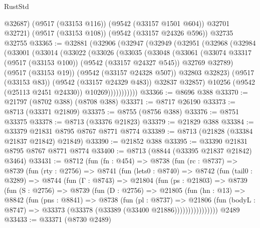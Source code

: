 \begin{lexlean}{RustStd}
\begin{coremodule}
        @32687)
      (@9517 (@33153 @116))
      (@9542 (@33157 @1501 @604))
      @32701
      @32721)
    (@9517 (@33153 @108))
    (@9542 (@33157 @24326 @596))
    @32735
    @32755
@33365 := @32881
    (@32906
      (@32947
        (@32949
          (@32951
            (@32968
              (@32984
                (@33001
                  (@33014
                    (@33022
                      (@33026
                        (@33035
                          (@33048
                            (@33061
                              (@33074
                                @33317
                                (@9517 (@33153 @100))
                                (@9542 (@33157 @24327 @545))
                                @32769
                                @32789)
                              (@9517 (@33153 @19))
                              (@9542 (@33157 @24328 @507))
                              @32803
                              @32823)
                            (@9517 (@33153 @83))
                            (@9542 (@33157 @24329 @483))
                            @32837
                            @32857)
                          @10256
                          (@9542 (@25113 @2451 @24330))
                          @10269)))))))))))
@33366 := @8696 @388
@33370 := @21797 (@8702 @388) (@8708 @388)
@33371 := @8717 @26190
@33373 := @8713 (@33371 @21809)
@33375 := @8755 (@8756 @388)
@33376 := @8751 @33375
@33378 := @8713 (@33376 @21823)
@33379 := @21829 @388
@33384 := @33379 @21831 @8795 @8767 @8771 @8774
@33389 := @8713 (@21828 (@33384 @21837 @21842) @21849)
@33390 := @21852 @388
@33395 := @33390 @21831 @8795 @8767 @8771 @8774
@33400 := @8713 (@8844 (@33395 @21837 @21842) @3464)
@33431 := @8712
    (fun (fn : @454) =>
    @8738
      (fun (rc : @8737) =>
      @8739
        (fun (rty : @2756) =>
        @8741
          (fun (lets0 : @8740) =>
          @8742
            (fun (tail0 : @3289) =>
            @8744
              (fun (Γ : @8743) =>
              @21804
                (fun (ps : @21803) =>
                @8739
                  (fun (S : @2756) =>
                  @8739
                    (fun (D : @2756) =>
                    @21805
                      (fun (hn : @13) =>
                      @8842
                        (fun (pns : @8841) =>
                        @8738
                          (fun (pl : @8737) =>
                          @21806
                            (fun (bodyL : @8747) =>
                            @33373 (@33378 (@33389 (@33400 @21886))))))))))))))))
    @2489
@33433 := @33371 (@8730 @2489)

\end{coremodule}
\end{lexlean}
